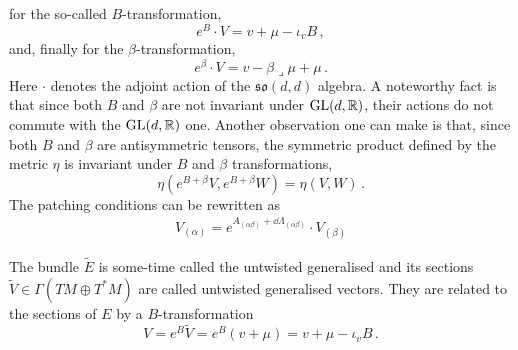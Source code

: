 \documentclass[debug]{phd}
\begin{document}
					for the so-called $B$-transformation,
							\begin{equation}\label{bact}
								e^B \cdot V = v + \mu - \iota_v B \, , 
							\end{equation}
					and, finally for the $\beta$-transformation,
							\begin{equation}
								e^\beta \cdot V = v - \beta \lrcorner \mu + \mu \, .
							\end{equation}
					Here $\cdot$ denotes the adjoint action of the $\mathfrak{so}(d,d)$ algebra.
					A noteworthy fact is that since both $B$ and $\beta$ are not invariant under $\mathrm{GL}(d, \mathbb{R})$, their actions do not commute with the $\mathrm{GL}(d, \mathbb{R})$ one.
					Another observation one can make is that, since both $B$ and $\beta$ are antisymmetric tensors, the symmetric product defined by the metric $\eta$ is invariant under $B$ and $\beta$ transformations,
							\begin{equation}
								\eta(e^{B + \beta} V, e^{B + \beta} W ) = \eta (V, W)\, .
							\end{equation}
The patching conditions can be rewritten as 												%
								\begin{equation}\label{patchV}
								\begin{array}{ccc}
								V_{(\alpha)} = e^{A_{(\alpha\beta)} + \dd \Lambda_{(\alpha\beta)}} \cdot V_{(\beta)} 
								\end{array}
							\end{equation}		
							
							
The bundle $\tilde{E}$ is some-time called the untwisted generalised and its sections $\tilde{V} \in \Gamma(TM \oplus T^*M)$ are called untwisted generalised vectors.
They are related to the sections of $E$ by a $B$-transformation 							%
								\begin{equation}\label{Btwist}
									V = e^{B} \tilde{V} = e^{B} (v + \mu) = v + \mu - \iota_v B \, .
								\end{equation}

	
						
					
					
\end{document}
